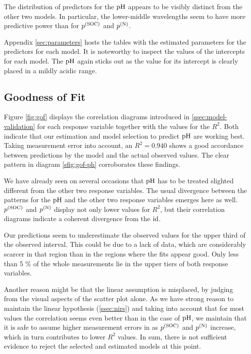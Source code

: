 		The distribution of predictors for the $\mathrm{pH}$ appears to be visibly distinct from the other two models.
		In particular, the lower-middle wavelengths seem to have more predictive power than for $p^{(\mathrm{SOC})}$ and $p^{(\mathrm{N})}$.
		
		Appendix \ref{sec:parameters} hosts the tables with the estimated parameters for the predictors for each model.
		It is noteworthy to inspect the values of the intercepts for each model.
		The $\mathrm{pH}$ again sticks out as the value for its intercept is clearly placed in a mildly acidic range. %

				

	\subsection{Goodness of Fit}
	\label{ssec:suitability}
	
		Figure \ref{fig:gof} displays the correlation diagrams introduced in \ref{ssec:model-validation} for each response variable together with the values for the $R^2$.
		Both indicate that our estimation and model selection to predict $\mathrm{pH}$ are working best.
		Taking measurement error into account, an $R^2 = 0.940$ shows a good accordance between predictions by the model and the actual observed values.
		The clear pattern in diagram \ref{sfig:gof-ph} corroborates these findings.
		
		We have already seen on several occasions that $\mathrm{pH}$ has to be treated slighted different from the other two response variables.
		The usual divergence between the patterns for the $\mathrm{pH}$ and the other two response variables emerges here as well.
		$p^{\mathrm{(SOC)}}$ and $p^{\mathrm{(N)}}$ display not only lower values for $R^2$, but their correlation diagrams indicate a coherent divergence from the $\operatorname{id}$.
		
		Our predictions seem to underestimate the observed values for the upper third of the observed interval.
		This could be due to a lack of data, which are considerably scarcer in that region than in the regions where the fits appear good.
		Only less than 5 \% of the whole measurements lie in the upper tiers of both response variables.
		
		Another reason might be that the linear assumption is misplaced, by judging from the visual aspects of the scatter plot alone.
		As we have strong reason to maintain the linear hypothesis (\ref{ssec:nirs}) and taking into account that for most values the correlation seems even better than in the case of $\mathrm{pH}$, we maintain that it is safe to assume higher measurement errors in as $p^{\mathrm{(SOC)}}$ and $p^{\mathrm{(N)}}$ increase, which in turn contributes to lower $R^2$ values.
		In sum, there is not sufficient evidence to reject the selected and estimated models at this point.
		

